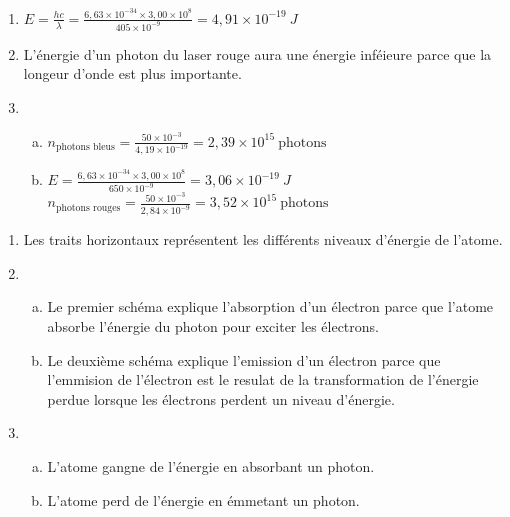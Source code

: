 \documentclass[12pt, a4paper]{article}
\begin{document}
    \begin{Exercise}[number={19}]
        \begin{enumerate}[1.]
            \item	$E=\frac{hc}{\lambda}=\frac{6{,}63\times 10^{-34}\times 3{,}00\times 10^{8}}{405\times 10^{-9}}=4{,}91\times 10^{-19}\ \si{J}$
            \item   L'énergie d'un photon du laser rouge aura une énergie inféieure parce que la longeur d'onde est plus importante.
            \item   \begin{enumerate}[a.]
                        \item	$n_\text{photons bleus}=\frac{50\times 10^{-3}}{4{,}19\times 10^{-19}}=2{,}39\times 10^{15}\ \text{photons}$
                        \item   $E=\frac{6{,}63\times 10^{-34}\times 3{,}00\times 10^{8}}{650\times 10^{-9}}=3{,}06\times 10^{-19}\ \si{J}$ \\ $n_\text{photons rouges}=\frac{50\times 10^{-3}}{2{,}84\times 10^{-9}}=3{,}52\times 10^{15}\ \text{photons}$
                    \end{enumerate}
        \end{enumerate}
    \end{Exercise}

    \begin{Exercise}[number={21}]
        \begin{enumerate}[1.]
            \item	Les traits horizontaux représentent les différents niveaux d'énergie de l'atome.
            \item   \begin{enumerate}[a.]
                        \item	Le premier schéma explique l'absorption d'un électron parce que l'atome absorbe l'énergie du photon pour exciter les électrons.
                        \item   Le deuxième schéma explique l'emission d'un électron parce que l'emmision de l'électron est le resulat de la transformation de l'énergie perdue lorsque les électrons perdent un niveau d'énergie.
                    \end{enumerate}
            \item   \begin{enumerate}[a.]
                        \item	L'atome gangne de l'énergie en absorbant un photon.
                        \item   L'atome perd de l'énergie en émmetant un photon.
                    \end{enumerate}
        \end{enumerate}
    \end{Exercise}
    
\end{document}
